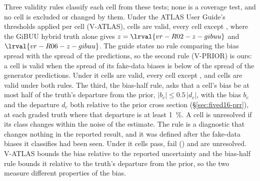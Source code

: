Three validity rules classify each cell from these tests; none is a coverage test, and no cell is excluded or changed by them. Under the ATLAS User Guide's thresholds applied per cell (V-ATLAS),  cells are valid, every cell except , where the GiBUU hybrid truth alone gives $z=\lrval{vr-R02-z-gibuu}$ and $\lrval{vr-R06-z-gibuu}$. The guide states no rule comparing the bias spread with the spread of the predictions, so the second rule (V-PRIOR) is ours: a cell is valid when the spread of its fake-data biases is below  of the spread of the generator predictions. Under it  cells are valid, every cell except , and  cells are valid under both rules. The third, the bias-half rule, asks that a cell's bias be at most half of the truth's departure from the prior, $|b_c|\leq0.5\,|d_c|$, with the bias $b_c$ and the departure $d_c$ both relative to the prior cross section (\S\ref{sec:fived16-prr}), at each graded truth where that departure is at least \SI{1}{\percent}. A cell is unresolved if its class changes within the noise of the estimate. The rule is a diagnostic that changes nothing in the reported result, and it was defined after the fake-data biases it classifies had been seen. Under it  cells pass,  fail () and  are unresolved. V-ATLAS bounds the bias relative to the reported uncertainty and the bias-half rule bounds it relative to the truth's departure from the prior, so the two measure different properties of the bias.

